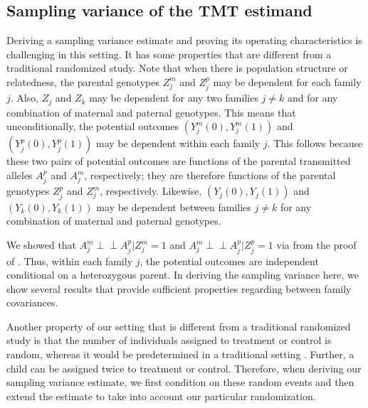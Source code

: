 \documentclass[12pt]{extarticle}
\newcommand{\ind}{\perp\!\!\!\!\perp}
\begin{document}
\subsection{Sampling variance of the TMT estimand} \label{sec:ir_estimate}

Deriving a sampling variance estimate and proving its operating characteristics is challenging in this setting. It has some properties that are different from a traditional randomized study. Note that when there is population structure or relatedness, the parental genotypes $Z^m_j$ and $Z^p_j$ may be dependent for each family $j$. Also, $Z_j$ and $Z_k$ may be dependent for any two families $j \not= k$ and for any combination of maternal and paternal genotypes. This means that unconditionally, the potential outcomes $(Y^m_j(0), Y^m_j(1))$ and $(Y^p_j(0), Y^p_j(1))$ may be dependent within each family $j$. This follows because these two pairs of potential outcomes are functions of the parental transmitted alleles $A^p_j$ and $A^m_j$, respectively; they are therefore functions of the parental genotypes $Z^p_j$ and $Z^m_j$, respectively. Likewise, $(Y_j(0), Y_j(1))$ and $(Y_k(0), Y_k(1))$ may be dependent between families $j \not= k$ for any combination of maternal and paternal genotypes. 

We showed that $A_j^m \ind A_j^p |Z_j^m=1$ and $A_j^m \ind A_j^p |Z_j^p=1$ via  from the proof of . Thus, within each family $j$, the potential outcomes are independent conditional on a heterozygous parent. In deriving the sampling variance here, we show several results that provide sufficient properties regarding between family covariances.

Another property of our setting that is different from a traditional randomized study is that the number of individuals assigned to treatment or control is random, whereas it would be predetermined in a traditional setting \citep{imbens2015}. Further, a child can be assigned twice to treatment or control. Therefore, when deriving our sampling variance estimate, we first condition on these random events and then extend the estimate to take into account our particular randomization.
\end{document}
